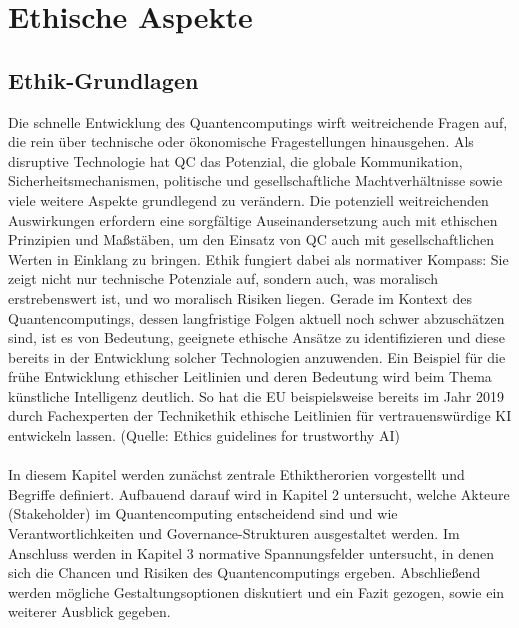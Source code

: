\chapter{Ethische Aspekte}
\label{ethics} %



\section{Ethik-Grundlagen}

Die schnelle Entwicklung des Quantencomputings wirft weitreichende Fragen auf, die rein über technische oder ökonomische Fragestellungen hinausgehen. Als disruptive Technologie hat QC das Potenzial, die globale Kommunikation, Sicherheitsmechanismen, politische und gesellschaftliche Machtverhältnisse sowie viele weitere Aspekte grundlegend zu verändern. Die potenziell weitreichenden Auswirkungen erfordern eine sorgfältige Auseinandersetzung auch mit ethischen Prinzipien und Maßstäben, um den Einsatz von QC auch mit gesellschaftlichen Werten in Einklang zu bringen. Ethik fungiert dabei als normativer Kompass: Sie zeigt nicht nur technische Potenziale auf, sondern auch, was moralisch erstrebenswert ist, und wo moralisch Risiken liegen. Gerade im Kontext des Quantencomputings, dessen langfristige Folgen aktuell noch schwer abzuschätzen sind, ist es von Bedeutung, geeignete ethische Ansätze zu identifizieren und diese bereits in der Entwicklung solcher Technologien anzuwenden. Ein Beispiel für die frühe Entwicklung ethischer Leitlinien und deren Bedeutung wird beim Thema künstliche Intelligenz deutlich. So hat die EU beispielsweise bereits im Jahr 2019 durch Fachexperten der Technikethik ethische Leitlinien für vertrauenswürdige KI entwickeln lassen. \cite{}
(Quelle: Ethics guidelines for trustworthy AI) 
\\
\\
In diesem Kapitel werden zunächst zentrale Ethiktherorien vorgestellt und Begriffe definiert. Aufbauend darauf wird in Kapitel 2 untersucht, welche Akteure (Stakeholder) im Quantencomputing entscheidend sind und wie Verantwortlichkeiten und Governance-Strukturen ausgestaltet werden. Im Anschluss werden in Kapitel 3  normative Spannungsfelder untersucht, in denen sich die Chancen und Risiken des Quantencomputings ergeben. Abschließend werden mögliche Gestaltungsoptionen diskutiert und ein Fazit gezogen, sowie ein weiterer Ausblick gegeben.

